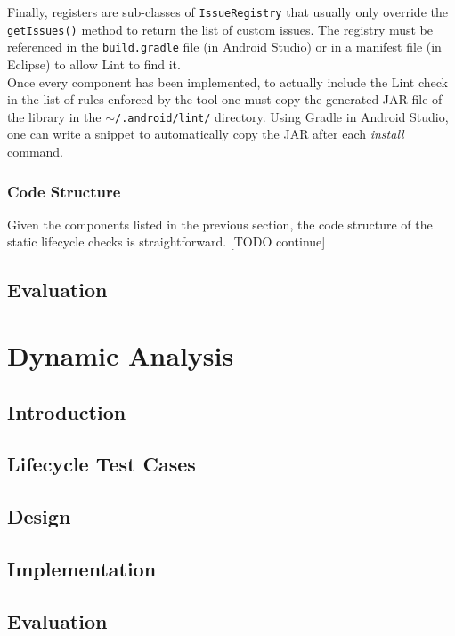 \documentclass[11pt,a4paper,notitlepage]{article}
\begin{document}
Finally, registers are sub-classes of \texttt{IssueRegistry} that usually only override the \texttt{getIssues()} method to return the list of custom issues. The registry must be referenced in the \texttt{build.gradle} file (in Android Studio) or in a manifest file (in Eclipse) to allow Lint to find it.\bigskip \\
Once every component has been implemented, to actually include the Lint check in the list of rules enforced by the tool one must copy the generated JAR file of the library in the \texttt{$\sim$/.android/lint/} directory. Using Gradle in Android Studio, one can write a snippet to automatically copy the JAR after each \textit{install} command.

\subsubsection{Code Structure}
Given the components listed in the previous section, the code structure of the static lifecycle checks is straightforward. [TODO continue]

\subsection{Evaluation}



\section{Dynamic Analysis}

\subsection{Introduction}

\subsection{Lifecycle Test Cases}

\subsection{Design}

\subsection{Implementation}

\subsection{Evaluation}
\end{document}
